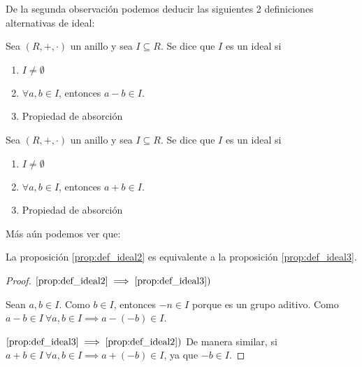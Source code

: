 De la segunda observación podemos deducir las siguientes 2 definiciones alternativas de ideal:
\begin{prop}\label{prop:def_ideal2}
	Sea $(R,+,\cdot)$ un anillo y sea $I \subseteq R$. Se dice que $I$ es un ideal si

	\begin{enumerate}
		\item $I \neq \emptyset$
		\item $\forall a,b \in I$, entonces $a-b \in I$.
		\item Propiedad de absorción
	\end{enumerate}
\end{prop}
\begin{prop}\label{prop:def_ideal3}
	Sea $(R,+,\cdot)$ un anillo y sea $I \subseteq R$. Se dice que $I$ es un ideal si

	\begin{enumerate}
		\item $I \neq \emptyset$
		\item $\forall a,b \in I$, entonces $a+b \in I$.
		\item Propiedad de absorción
	\end{enumerate}
\end{prop}

Más aún podemos ver que:
\begin{prop}
	La proposición \ref{prop:def_ideal2} es equivalente a la proposición \ref{prop:def_ideal3}.
\end{prop}
\begin{proof}
	$\ref{prop:def_ideal2} \implies \ref{prop:def_ideal3})$

	Sean $a,b \in I$. Como $b \in I$, entonces $-n \in I$ porque es un grupo aditivo.
	Como $a-b \in I \ \forall a,b \in I \implies a-(-b) \in I$.

	$\ref{prop:def_ideal3} \implies \ref{prop:def_ideal2})$
	De manera similar, si $a+b \in I \ \forall a,b \in I \implies a+(-b) \in I$, ya que $-b \in I$.
\end{proof}

